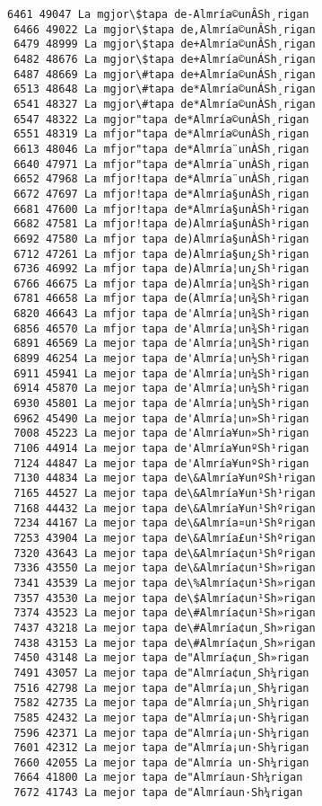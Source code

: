 \documentclass[11pt]{article}
\begin{document}
\begin{Verbatim}[commandchars=\\\{\}]
 6461 49047 La mgjor\$tapa de-Almría©unÂSh¸rigan
 6466 49022 La mgjor\$tapa de,Almría©unÂSh¸rigan
 6479 48999 La mgjor\$tapa de+Almría©unÂSh¸rigan
 6482 48676 La mgjor\$tapa de+Almría©unÁSh¸rigan
 6487 48669 La mgjor\#tapa de+Almría©unÁSh¸rigan
 6513 48648 La mgjor\#tapa de*Almría©unÁSh¸rigan
 6541 48327 La mgjor\#tapa de*Almría©unÀSh¸rigan
 6547 48322 La mgjor"tapa de*Almría©unÀSh¸rigan
 6551 48319 La mfjor"tapa de*Almría©unÀSh¸rigan
 6613 48046 La mfjor"tapa de*Almría¨unÀSh¸rigan
 6640 47971 La mfjor"tapa de*Almría¨unÀSh¸rigan
 6652 47968 La mfjor!tapa de*Almría¨unÀSh¸rigan
 6672 47697 La mfjor!tapa de*Almría§unÀSh¸rigan
 6681 47600 La mfjor!tapa de*Almría§unÀSh¹rigan
 6682 47581 La mfjor!tapa de)Almría§unÀSh¹rigan
 6692 47580 La mfjor tapa de)Almría§unÀSh¹rigan
 6712 47261 La mfjor tapa de)Almría§un¿Sh¹rigan
 6736 46992 La mfjor tapa de)Almría¦un¿Sh¹rigan
 6766 46675 La mfjor tapa de)Almría¦un¾Sh¹rigan
 6781 46658 La mfjor tapa de(Almría¦un¾Sh¹rigan
 6820 46643 La mfjor tapa de'Almría¦un¾Sh¹rigan
 6856 46570 La mfjor tapa de'Almría¦un¾Sh¹rigan
 6891 46569 La mejor tapa de'Almría¦un¾Sh¹rigan
 6899 46254 La mejor tapa de'Almría¦un½Sh¹rigan
 6911 45941 La mejor tapa de'Almría¦un¼Sh¹rigan
 6914 45870 La mejor tapa de'Almría¦un¼Sh¹rigan
 6930 45801 La mejor tapa de'Almría¦un¼Sh¹rigan
 6962 45490 La mejor tapa de'Almría¦un»Sh¹rigan
 7008 45223 La mejor tapa de'Almría¥un»Sh¹rigan
 7106 44914 La mejor tapa de'Almría¥unºSh¹rigan
 7124 44847 La mejor tapa de'Almría¥unºSh¹rigan
 7130 44834 La mejor tapa de\&Almría¥unºSh¹rigan
 7165 44527 La mejor tapa de\&Almría¥un¹Sh¹rigan
 7168 44432 La mejor tapa de\&Almría¥un¹Shºrigan
 7234 44167 La mejor tapa de\&Almría¤un¹Shºrigan
 7253 43904 La mejor tapa de\&Almría£un¹Shºrigan
 7320 43643 La mejor tapa de\&Almría¢un¹Shºrigan
 7336 43550 La mejor tapa de\&Almría¢un¹Sh»rigan
 7341 43539 La mejor tapa de\%Almría¢un¹Sh»rigan
 7357 43530 La mejor tapa de\$Almría¢un¹Sh»rigan
 7374 43523 La mejor tapa de\#Almría¢un¹Sh»rigan
 7437 43218 La mejor tapa de\#Almría¢un¸Sh»rigan
 7438 43153 La mejor tapa de\#Almría¢un¸Sh»rigan
 7450 43148 La mejor tapa de"Almría¢un¸Sh»rigan
 7491 43057 La mejor tapa de"Almría¢un¸Sh¼rigan
 7516 42798 La mejor tapa de"Almría¡un¸Sh¼rigan
 7582 42735 La mejor tapa de"Almría¡un¸Sh¼rigan
 7585 42432 La mejor tapa de"Almría¡un·Sh¼rigan
 7596 42371 La mejor tapa de"Almría¡un·Sh¼rigan
 7601 42312 La mejor tapa de"Almría¡un·Sh¼rigan
 7660 42055 La mejor tapa de"Almría un·Sh¼rigan
 7664 41800 La mejor tapa de"Almríaun·Sh¼rigan
 7672 41743 La mejor tapa de"Almríaun·Sh¼rigan

\end{Verbatim}
\end{document}
